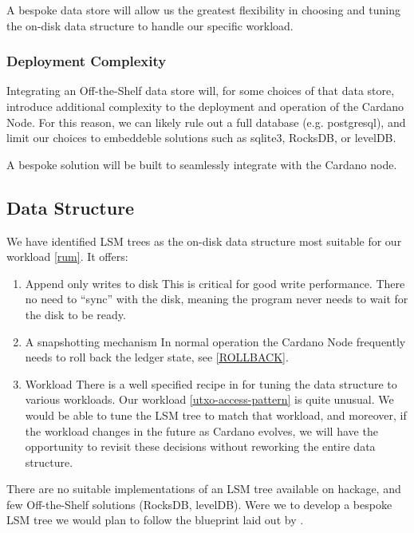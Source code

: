 \documentclass[11pt,a4paper]{article}
\begin{document}
A bespoke data store will allow us the greatest flexibility in choosing and
tuning the on-disk data structure to handle our specific workload.

\subsubsection{Deployment Complexity}
Integrating an Off-the-Shelf data store will, for some choices of that data
store, introduce additional complexity to the deployment and operation of the
Cardano Node. For this reason, we can likely rule out a full database (e.g.
postgresql), and limit our choices to embeddeble solutions such as sqlite3,
RocksDB, or levelDB.

A bespoke solution will be built to seamlessly integrate with the Cardano node.

\subsection{Data Structure}
\label{data-structure}

We have identified LSM trees \cite{monkey} as the on-disk data structure most
suitable for our workload \ref{rum}. It offers:

\begin{enumerate}
  \item Append only writes to disk
        This is critical for good write performance. There no need to ``sync''
        with the disk, meaning the program never needs to wait for the disk to be ready.
  \item A snapshotting mechanism
        In normal operation the Cardano Node frequently needs to roll back the
        ledger state, see \ref{ROLLBACK}.
  \item Workload
        There is a  well specified recipe in \cite{monkey} for tuning  the data
        structure to various workloads. Our workload \ref{utxo-access-pattern} is quite unusual. We
        would be able to tune the LSM tree to match that workload, and moreover, if the
        workload changes in the future as Cardano evolves, we will have the opportunity
        to revisit these decisions without reworking the entire data structure.
\end{enumerate}

There are no suitable implementations of an LSM tree available on hackage, and
few Off-the-Shelf solutions (RocksDB, levelDB). Were we to develop a bespoke LSM
tree we would plan to follow the blueprint laid out by \cite{monkey}.
\end{document}

